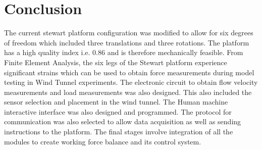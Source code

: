\chapter*{Conclusion}
The current stewart platform configuration was modified to allow for six degrees of freedom which included three translations and three rotations.
The platform has a high quality index i.e. 0.86 and is therefore mechanically feasible. From Finite Element Analysis, the six legs of the Stewart platform experience significant strains which can be used to obtain force measurements during model testing in Wind Tunnel experiments.
The electronic circuit to obtain flow velocity measurements and load measurements was also designed. This also included the sensor selection and placement in the wind tunnel. 
The Human machine interactive interface was also designed and programmed. The protocol for communication was also selected to allow data acquisition as well as sending instructions to the platform. 
The final stages involve integration of all the modules to create working force balance and its control system.